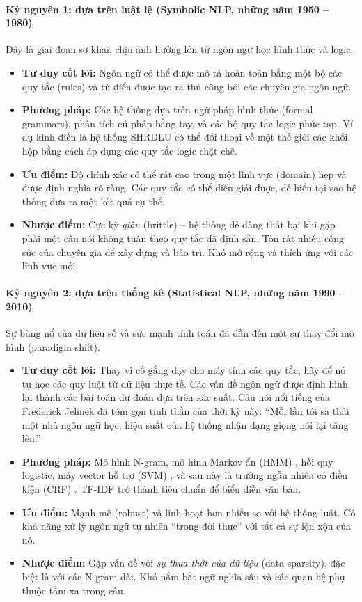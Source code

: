 \paragraph{Kỷ nguyên 1: dựa trên luật lệ (Symbolic NLP, những năm 1950 -- 1980)}
Đây là giai đoạn sơ khai, chịu ảnh hưởng lớn từ ngôn ngữ học hình thức và logic.
\begin{itemize}
    \item \textbf{Tư duy cốt lõi:} Ngôn ngữ có thể được mô tả hoàn toàn bằng một bộ các quy tắc (rules) và từ điển được tạo ra thủ công bởi các chuyên gia ngôn ngữ.
    \item \textbf{Phương pháp:} Các hệ thống dựa trên ngữ pháp hình thức (formal grammars), phân tích cú pháp bằng tay, và các bộ quy tắc logic phức tạp. Ví dụ kinh điển là hệ thống SHRDLU \cite{winograd1972understanding} có thể đối thoại về một thế giới các khối hộp bằng cách áp dụng các quy tắc logic chặt chẽ.
    \item \textbf{Ưu điểm:} Độ chính xác có thể rất cao trong một lĩnh vực (domain) hẹp và được định nghĩa rõ ràng. Các quy tắc có thể diễn giải được, dễ hiểu tại sao hệ thống đưa ra một kết quả cụ thể.
    \item \textbf{Nhược điểm:} Cực kỳ \textit{giòn} (brittle) -- hệ thống dễ dàng thất bại khi gặp phải một câu nói không tuân theo quy tắc đã định sẵn. Tốn rất nhiều công sức của chuyên gia để xây dựng và bảo trì. Khó mở rộng và thích ứng với các lĩnh vực mới.
\end{itemize}

\paragraph{Kỷ nguyên 2: dựa trên thống kê (Statistical NLP, những năm 1990 -- 2010)}
Sự bùng nổ của dữ liệu số và sức mạnh tính toán đã dẫn đến một sự thay đổi mô hình (paradigm shift).
\begin{itemize}
    \item \textbf{Tư duy cốt lõi:} Thay vì cố gắng dạy cho máy tính các quy tắc, hãy để nó tự học các quy luật từ dữ liệu thực tế. Các vấn đề ngôn ngữ được định hình lại thành các bài toán dự đoán dựa trên xác suất. Câu nói nổi tiếng của Frederick Jelinek đã tóm gọn tinh thần của thời kỳ này: “Mỗi lần tôi sa thải một nhà ngôn ngữ học, hiệu suất của hệ thống nhận dạng giọng nói lại tăng lên.”
    \item \textbf{Phương pháp:} Mô hình N-gram, mô hình Markov ẩn (HMM) \cite{rabiner1989tutorial}, hồi quy logistic, máy vector hỗ trợ (SVM) \cite{cortes1995support}, và sau này là trường ngẫu nhiên có điều kiện (CRF) \cite{lafferty2001conditional}. TF-IDF trở thành tiêu chuẩn để biểu diễn văn bản.
    \item \textbf{Ưu điểm:} Mạnh mẽ (robust) và linh hoạt hơn nhiều so với hệ thống luật. Có khả năng xử lý ngôn ngữ tự nhiên “trong đời thực” với tất cả sự lộn xộn của nó.
    \item \textbf{Nhược điểm:} Gặp vấn đề với \textit{sự thưa thớt của dữ liệu} (data sparsity), đặc biệt là với các N-gram dài. Khó nắm bắt ngữ nghĩa sâu và các quan hệ phụ thuộc tầm xa trong câu.
\end{itemize}

